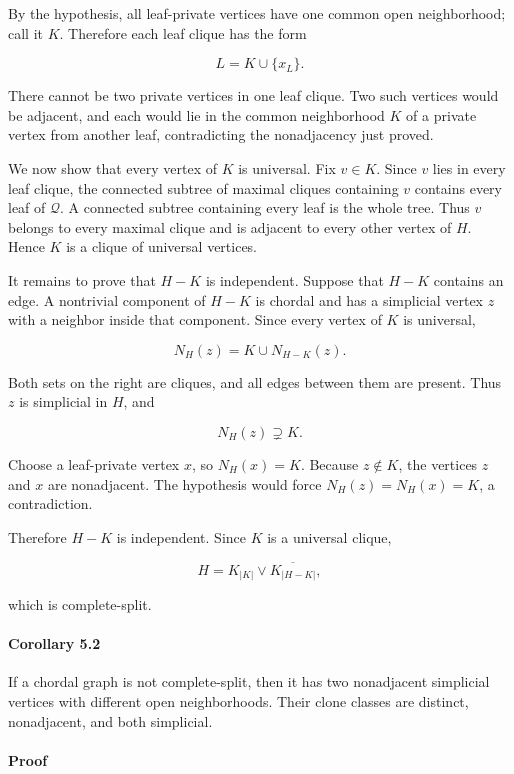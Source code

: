 \documentclass[english,11pt,a4paper]{article}
\begin{document}
By the hypothesis, all leaf-private vertices have one common open
neighborhood; call it \(K\). Therefore each leaf clique has the form

\[
L=K\cup\{x_L\}.
\]

There cannot be two private vertices in one leaf clique. Two such
vertices would be adjacent, and each would lie in the common
neighborhood \(K\) of a private vertex from another leaf, contradicting
the nonadjacency just proved.

We now show that every vertex of \(K\) is universal. Fix \(v\in K\).
Since \(v\) lies in every leaf clique, the connected subtree of maximal
cliques containing \(v\) contains every leaf of \(\mathcal Q\). A
connected subtree containing every leaf is the whole tree. Thus \(v\)
belongs to every maximal clique and is adjacent to every other vertex of
\(H\). Hence \(K\) is a clique of universal vertices.

It remains to prove that \(H-K\) is independent. Suppose that \(H-K\)
contains an edge. A nontrivial component of \(H-K\) is chordal and has a
simplicial vertex \(z\) with a neighbor inside that component. Since
every vertex of \(K\) is universal,

\[
N_H(z)=K\cup N_{H-K}(z).
\]

Both sets on the right are cliques, and all edges between them are
present. Thus \(z\) is simplicial in \(H\), and

\[
N_H(z)\supsetneq K.
\]

Choose a leaf-private vertex \(x\), so \(N_H(x)=K\). Because
\(z\notin K\), the vertices \(z\) and \(x\) are nonadjacent. The
hypothesis would force \(N_H(z)=N_H(x)=K\), a contradiction.

Therefore \(H-K\) is independent. Since \(K\) is a universal clique,

\[
H=K_{|K|}\vee\overline{K_{|H-K|}},
\]

which is complete-split.

\paragraph{Corollary 5.2}\label{corollary-5.2}

If a chordal graph is not complete-split, then it has two nonadjacent
simplicial vertices with different open neighborhoods. Their clone
classes are distinct, nonadjacent, and both simplicial.

\paragraph{Proof}\label{proof-6}
\end{document}
